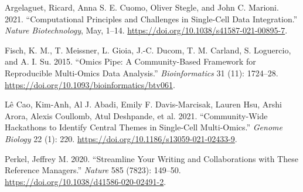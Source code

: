 \documentclass[smallextended]{svjour3}       %
\newlength{\cslhangindent}
\newlength{\cslentryspacingunit} %
\newenvironment{CSLReferences}[2] %
 {%
  \setlength{\parindent}{0pt}
  \ifodd #1
  \let\oldpar\par
  \def\par{\hangindent=\cslhangindent\oldpar}
  \fi
  \setlength{\parskip}{#2\cslentryspacingunit}
 }%
 {}
\begin{document}
\hypertarget{refs}{}
\begin{CSLReferences}{1}{0}
\leavevmode{}%
Argelaguet, Ricard, Anna S. E. Cuomo, Oliver Stegle, and John C. Marioni. 2021. {``Computational Principles and Challenges in Single-Cell Data Integration.''} \emph{Nature Biotechnology}, May, 1--14. \url{https://doi.org/10.1038/s41587-021-00895-7}.

\leavevmode{}%
Fisch, K. M., T. Meissner, L. Gioia, J.-C. Ducom, T. M. Carland, S. Loguercio, and A. I. Su. 2015. {``Omics {Pipe}: A Community-Based Framework for Reproducible Multi-Omics Data Analysis.''} \emph{Bioinformatics} 31 (11): 1724--28. \url{https://doi.org/10.1093/bioinformatics/btv061}.

\leavevmode{}%
Lê Cao, Kim-Anh, Al J. Abadi, Emily F. Davis-Marcisak, Lauren Hsu, Arshi Arora, Alexis Coullomb, Atul Deshpande, et al. 2021. {``Community-Wide Hackathons to Identify Central Themes in Single-Cell Multi-Omics.''} \emph{Genome Biology} 22 (1): 220. \url{https://doi.org/10.1186/s13059-021-02433-9}.

\leavevmode{}%
Perkel, Jeffrey M. 2020. {``Streamline Your Writing {\textemdash} and Collaborations {\textemdash} with These Reference Managers.''} \emph{Nature} 585 (7823): 149--50. \url{https://doi.org/10.1038/d41586-020-02491-2}.

\end{CSLReferences}




\end{document}
